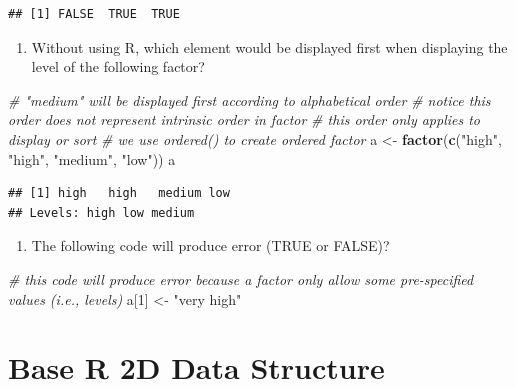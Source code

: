 \documentclass[]{book}
\newenvironment{Shaded}{\begin{snugshade}}{\end{snugshade}}
\newcommand{\CommentTok}[1]{\textcolor[rgb]{0.56,0.35,0.01}{\textit{#1}}}
\newcommand{\DecValTok}[1]{\textcolor[rgb]{0.00,0.00,0.81}{#1}}
\newcommand{\KeywordTok}[1]{\textcolor[rgb]{0.13,0.29,0.53}{\textbf{#1}}}
\newcommand{\NormalTok}[1]{#1}
\newcommand{\StringTok}[1]{\textcolor[rgb]{0.31,0.60,0.02}{#1}}
\providecommand{\tightlist}{%
  \setlength{\itemsep}{0pt}\setlength{\parskip}{0pt}}
\begin{document}
\begin{verbatim}
## [1] FALSE  TRUE  TRUE
\end{verbatim}

\begin{enumerate}
\def\labelenumi{\arabic{enumi}.}
\setcounter{enumi}{8}
\tightlist
\item
  Without using R, which element would be displayed first when displaying the level of the following factor?
\end{enumerate}

\begin{Shaded}
\begin{Highlighting}[]
\CommentTok{# "medium" will be displayed first according to alphabetical order}
\CommentTok{# notice this order does not represent intrinsic order in factor}
\CommentTok{# this order only applies to display or sort}
\CommentTok{# we use ordered() to create ordered factor}
\NormalTok{a <-}\StringTok{ }\KeywordTok{factor}\NormalTok{(}\KeywordTok{c}\NormalTok{(}\StringTok{"high"}\NormalTok{, }\StringTok{"high"}\NormalTok{, }\StringTok{"medium"}\NormalTok{, }\StringTok{"low"}\NormalTok{))}
\NormalTok{a}
\end{Highlighting}
\end{Shaded}

\begin{verbatim}
## [1] high   high   medium low   
## Levels: high low medium
\end{verbatim}

\begin{enumerate}
\def\labelenumi{\arabic{enumi}.}
\setcounter{enumi}{9}
\tightlist
\item
  The following code will produce error (TRUE or FALSE)?
\end{enumerate}

\begin{Shaded}
\begin{Highlighting}[]
\CommentTok{# this code will produce error because a factor only allow some pre-specified values (i.e., levels)}
\NormalTok{a[}\DecValTok{1}\NormalTok{] <-}\StringTok{ "very high"}
\end{Highlighting}
\end{Shaded}

\hypertarget{base-r-2d-data-structure}{%
\chapter{Base R 2D Data Structure}\label{base-r-2d-data-structure}}
\end{document}
